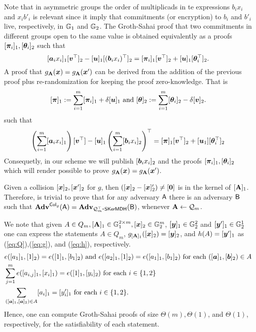 Note that in asymmetric groups the order of multiplicads in te expressions $b_ix_i$ and $x_ib'_i$ is relevant since it imply that commitments (or encryption) to $b_i$ and $b'_i$ live, respectively, in $\mathbb{G}_1$ and $\mathbb{G}_2$. The Groth-Sahai proof that two commitments in different groups open to the same value is obtained equivalently as a proofs $[{\boldsymbol{\pi}}_i]_1,[{\boldsymbol{\theta}}_i]_2$ such that
$$ 
[{\boldsymbol{a}}_ix_i]_1[{\boldsymbol{v}}^\top]_2-[{\boldsymbol{u}}]_1[({\boldsymbol{b}}_ix_i)^\top]_2 =[{\boldsymbol{\pi}}_i]_1[{\boldsymbol{v}}^\top]_2+[{\boldsymbol{u}}]_1[{\boldsymbol{\theta}}^\top_i]_2.
$$
A proof that $g_{\mathbf{{A}}}({\boldsymbol{x}}) = g_{\mathbf{{A}}}({\boldsymbol{x}}')$ can be derived from the addition of the previous proof plus re-randomization for keeping the proof zero-knowledge. That is
$$
[{\boldsymbol{\pi}}]_1 := \sum_{i=1}^m [{\boldsymbol{\pi}}_i]_1+\delta[{\boldsymbol{u}}]_1
\text{ and }
[{\boldsymbol{\theta}}]_2 := \sum_{i=1}^m [{\boldsymbol{\theta}}_i]_2-\delta[{\boldsymbol{v}}]_2.
$$
such that
$$
\left(\sum_{i=1}^m [{\boldsymbol{a}}_ix_i]_1\right)[{\boldsymbol{v}}^\top]-[{\boldsymbol{u}}]_1\left(\sum_{i=1}^m[{\boldsymbol{b}}_ix_i]_2\right)^\top =
[{\boldsymbol{\pi}}]_1[{\boldsymbol{v}}^\top]_2 + [{\boldsymbol{u}}_1][{\boldsymbol{\theta}}_i^\top]_2
$$ Consequetly, in our scheme we will publish  $[{\boldsymbol{b}}_ix_i]_2$ and the proofs $[{\boldsymbol{\pi}}_i]_1,[{\boldsymbol{\theta}}_i]_2$ which will render possible to prove $g_{\mathbf{{A}}}({\boldsymbol{x}})=g_{\mathbf{{A}}}({\boldsymbol{x}}')$.

Given a collision $[{\boldsymbol{x}}]_2,[{\boldsymbol{x}}']_2$ for $g$, then $([{\boldsymbol{x}}]_2-[{\boldsymbol{x}}]'_2)\neq [{\boldsymbol{0}}]$ is in the kernel of $[\mathbf{{A}}]_1$. Therefore, is trivial to prove that for any adversary $\mathsf{A}$ there is an adversary $\mathsf{B}$ such that $\mathbf{Adv}^{\mathsf{Col}_g}(\mathsf{A})=\mathbf{Adv}_{\mathcal{Q}_m^\top\mbox{-}\mathsf{SKerMDH}}(\mathsf{B})$, whenever $\mathbf{{A}}\gets\mathcal{Q}_m$.

We note that given $A\in Q_m,[\mathbf{{A}}]_1\in\mathbb{G}^{2\times m}_1,[{\boldsymbol{x}}]_2\in\mathbb{G}^m_2$, $[{\boldsymbol{y}}]_1\in\mathbb{G}_2^2$ and $[{\boldsymbol{y}}']_1\in\mathbb{G}^1_2$ one can express the statements $A\in Q_m$, $g_{[\mathbf{{A}}]_1}([{\boldsymbol{x}}]_2)=[{\boldsymbol{y}}]_2$, and $h(A)=[{\boldsymbol{y}}']_1$ as (\ref{eq:Q}),(\ref{eq:g}), and (\ref{eq:h}), respectively.
 \begin{align}
&e([a_{1}]_1,[1]_2) = e([1]_1,[{b}_1]_2)\text{ and }e([a_{2}]_1,[1]_2)=e([a_{1}]_1,[b_1]_2)
\text{ for each }([{\boldsymbol{a}}]_1,[{\boldsymbol{b}}]_2)\in A \label{eq:Q}\\
&\sum_{j=1}^m e([a_{i,j}]_1,[x_i]_1) = e([1]_1,[y_i]_2) \text{ for each } i\in\{1,2\} \label{eq:g}\\
&\sum_{([{\boldsymbol{a}}]_1,[{\boldsymbol{a}}]_2)\in A} [a_i]_1 = [y'_i]_1 \text{ for each } i\in\{1,2\}.\label{eq:h}
\end{align}
Hence, one can compute Groth-Sahai proofs of size $\Theta(m),\Theta(1)$, and $\Theta(1)$, respectively, for the satisfiability of each statement.


